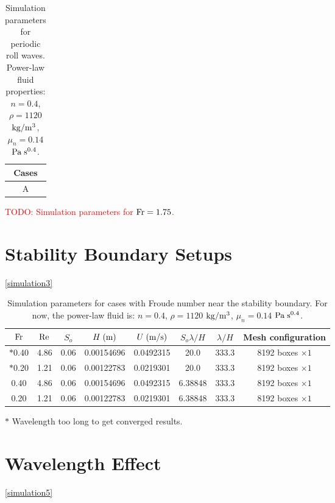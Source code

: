 \documentclass[a4paper]{article}
\newcommand{\fr}{{\rm{Fr}}}
\begin{document}
\begin{table}[htbp]
	\begin{subtable}{1\textwidth}
		\centering
		\begin{tabular}{c}
			Cases\\
			\toprule
				A \\
			\bottomrule 
		\end{tabular}
		\caption{\textcolor{red}{TODO: Simulation parameters for $\fr=1.75$.}}
		\label{params_175}
	\end{subtable}

	\caption{Simulation parameters for periodic roll waves. Power-law fluid properties: $n=0.4$, $\rho=1120$ $\rm{kg/m^3}$, $\mu_n=0.14$ $\rm Pa\;s^{0.4}$.}
	\label{simulation2}
\end{table}

\section{Stability Boundary Setups}
\autoref{simulation3}
\begin{table}[htbp]
	\centering
	\begin{tabular}{cccccccc}
		$\fr$ & $\rm Re$ & $S_o$ & $H\;{\rm (m)}$ & $U\;{\rm (m/s)}$ & $S_o\lambda/H$ & $\lambda/H$ & Mesh configuration\\
		\toprule
		$*$0.40 & 4.86 & 0.06 & 0.00154696 & 0.0492315 & 20.0 & 333.3 & 8192 boxes $\times 1$\\
		$*$0.20 & 1.21 & 0.06 & 0.00122783 & 0.0219301 & 20.0 & 333.3 & 8192 boxes $\times 1$\\
		
		0.40 & 4.86 & 0.06 & 0.00154696 & 0.0492315 & 6.38848 & 333.3 & 8192 boxes $\times 1$\\
		0.20 & 1.21 & 0.06 & 0.00122783 & 0.0219301 & 6.38848 & 333.3 & 8192 boxes $\times 1$\\
		
		\bottomrule 
	\end{tabular}
	\begin{tablenotes}
		\small
		\item $*$ Wavelength too long to get converged results.
	\end{tablenotes}
	\caption{Simulation parameters for cases with Froude number near the stability boundary. For now, the power-law fluid is: $n=0.4$, $\rho=1120$ $\rm{kg/m^3}$, $\mu_n=0.14$ $\rm Pa\;s^{0.4}$.}
	\label{simulation3}
\end{table}

\section{Wavelength Effect}
\autoref{simulation5}
\end{document}
